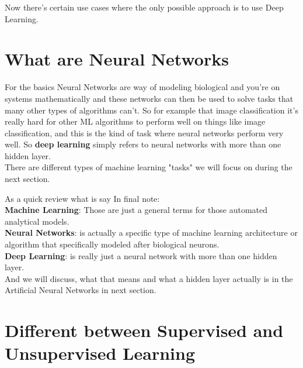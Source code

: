 \documentclass[12pt]{article}
\begin{document}
Now there's certain use cases where the only possible approach is to use Deep Learning.    


\section{What are Neural Networks}
For the basics Neural Networks are way of modeling biological and you're on systems mathematically and these networks can then be used to solve tasks that many other types of algorithms can't. 
So for example that image classification it's really hard for other ML algorithms to perform well on things like image classification, and this is the kind of task where neural networks perform very well. 
So \textbf{deep learning} simply refers to neural networks with more than one hidden layer. \\

There are different types of machine learning "tasks" we will focus on during the next section.

As a quick review what is say In final note:\\
\textbf{Machine Learning}: Those are just a general terms for those automated analytical models.\\
\textbf{Neural Networks}: is actually a specific type of machine learning architecture or algorithm that specifically modeled after biological neurons.\\
\textbf{Deep Learning}: is really just a neural network with more than one hidden layer.\\ 
And we will discuss, what that means and what a hidden layer actually is in the Artificial Neural Networks in next section.\\

\section{Different between Supervised and Unsupervised Learning}
\end{document}
